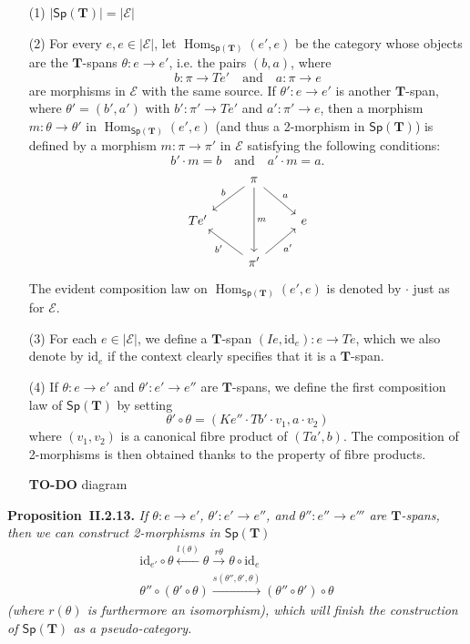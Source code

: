 \documentclass[fleqn]{article}
\newenvironment{itenv}[1]
  {\phantomsection\par\medskip\noindent\textbf{#1.}\itshape}
  {\par\medskip}
\newcommand{\oldpage}[1]{\marginpar{\footnotesize$\Big\vert$ \textit{p.~#1}}}
\newcommand{\todo}{{\color{purple}\textbf{TO-DO }}}
\newcommand{\id}{\mathrm{id}}
\newcommand{\TT}{\mathbf{T}}
\newcommand{\textand}{\quad\text{and}\quad}
\newcommand{\cat}[1]{\mathcal{#1}}
\newcommand{\Cat}[1]{\mathsf{#1}}
\newcommand{\set}[1]{|#1|}
\newcommand{\Sp}[1]{\Cat{Sp}(#1)}
\DeclareMathOperator{\Hom}{Hom}
\begin{document}
\begin{enumerate}
  \item[(1)]
    $\set{\Sp{\TT}}=\set{\cat{E}}$

  \item[(2)]
    For every $e,e\in\set{\cat{E}}$, let $\Hom_{\Sp{\TT}}(e',e)$ be the category whose objects are the $\TT$-spans $\theta\colon e\to e'$, i.e. the pairs $(b,a)$, where
    \[
      b\colon\pi\to Te'
      \textand
      a\colon \pi\to e
    \]
    are morphisms in $\cat{E}$ with the same source.
    If $\theta'\colon e\to e'$ is another $\TT$-span, where $\theta'=(b',a')$ with $b'\colon\pi'\to Te'$ and $a'\colon\pi'\to e$, then a morphism $m\colon\theta\to\theta'$ in $\Hom_{\Sp{\TT}}(e',e)$ (and thus a 2-morphism in $\Sp{\TT}$) is defined by a morphism $m\colon\pi\to\pi'$ in $\cat{E}$ satisfying the following conditions:
    \[
      b'\cdot m = b
      \textand
      a'\cdot m = a.
    \]
    \[
      \begin{tikzcd}
      & \pi
          \ar[dl,swap,"b"]
          \ar[dr,"a"]
          \ar[dd,"m"]
      \\Te'
      &&e
      \\&\pi'
          \ar[ul,"b'"]
          \ar[ur,swap,"a'"]
      \end{tikzcd}
    \]
    The evident composition law on $\Hom_{\Sp{\TT}}(e',e)$ is denoted by $\cdot$ just as for $\cat{E}$.

  \item[(3)]
    For each $e\in\set{\cat{E}}$, we define a $\TT$-span $(Ie,\id_e)\colon e\to Te$, which we also denote by $\id_e$ if the context clearly specifies that it is a $\TT$-span.

  \item[(4)]
    If $\theta\colon e\to e'$ and $\theta'\colon e'\to e''$ are $\TT$-spans, we define the first composition law of $\Sp{\TT}$ by setting
    \[
      \theta'\circ\theta
      = (Ke''\cdot Tb'\cdot v_1, a\cdot v_2)
    \]
    where $(v_1,v_2)$ is a canonical fibre product of $(Ta',b)$.
    The composition of 2-morphisms is then obtained thanks to the property of fibre products.

    \oldpage{31}
    \todo{diagram}
\end{enumerate}

\begin{itenv}{Proposition~II.2.13}
  If $\theta\colon e\to e'$, $\theta'\colon e'\to e''$, and $\theta''\colon e''\to e'''$ are $\TT$-spans, then we can construct 2-morphisms in $\Sp{\TT}$
  \[
    \begin{gathered}
      \id_{e'}\circ\theta
      \xleftarrow{l(\theta)} \theta
      \xrightarrow{r\theta} \theta\circ\id_e
    \\\theta''\circ(\theta'\circ\theta)
      \xrightarrow{s(\theta'',\theta',\theta)} (\theta''\circ\theta')\circ\theta
    \end{gathered}
  \]
   (where $r(\theta)$ is furthermore an isomorphism), which will finish the construction of $\Sp{\TT}$ as a pseudo-category.
\end{itenv}
\end{document}
